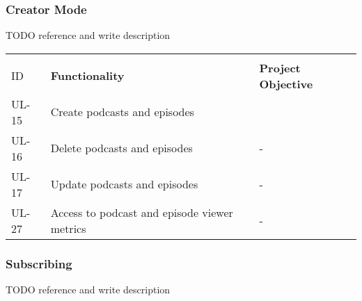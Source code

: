 \documentclass[../report.tex]{subfiles}
\begin{document}
\subsubsection{Creator Mode}

TODO reference and write description

\begin{longtable}[c]{|l|l|l|}
  \hline
  \rowcolor[HTML]{E2E2E2} 
  \textbf{\begin{tabular}[c]{@{}l@{}}Story \\ ID\end{tabular}} & \textbf{Functionality}                       & \textbf{Project Objective}                  \\ \hline
  \endfirsthead
  \endhead
  \rowcolor[HTML]{FAFAFA} 
  UL-15                                                        & Create podcasts and episodes                 & \cellcolor[HTML]{FAFAFA}                    \\
  \rowcolor[HTML]{FAFAFA} 
  UL-16                                                        & Delete podcasts and episodes                 & \multirow{-2}{*}{\cellcolor[HTML]{FAFAFA}-} \\ \hline
  \rowcolor[HTML]{FAFAFA} 
  UL-17                                                        & Update podcasts and episodes                 & -                                           \\ \hline
  \rowcolor[HTML]{E8FBFF} 
  UL-27                                                        & Access to podcast and episode viewer metrics & -                                           \\ \hline
\end{longtable}

\subsubsection{Subscribing}

TODO reference and write description
\end{document}

